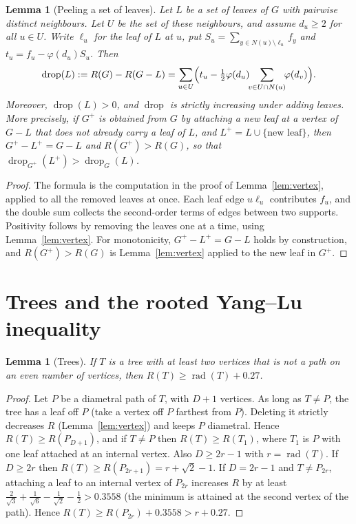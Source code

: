 \documentclass[11pt,a4paper]{article}
\newtheorem{lemma}[theorem]{Lemma}
\theoremstyle{definition}
\newcommand{\rad}{\operatorname{rad}}
\newcommand{\drop}{\operatorname{drop}}
\begin{document}
\begin{lemma}[Peeling a set of leaves]\label{lem:dropformula}
Let $L$ be a set of leaves of $G$ with pairwise distinct neighbours. Let $U$ be the set of these neighbours, and assume $d_u\ge2$ for all $u\in U$. Write $\ell_u$ for the leaf of $L$ at $u$, put $S_u=\sum_{y\in N(u)\setminus\ell_u}f_y$ and $t_u=f_u-\varphi(d_u)S_u$. Then
\[
\drop(L):=R(G)-R(G-L)=\sum_{u\in U}\Bigl(t_u-\tfrac12\varphi(d_u)\!\!\sum_{v\in U\cap N(u)}\!\!\varphi(d_v)\Bigr).
\]
Moreover, $\drop(L)>0$, and $\drop$ is strictly increasing under adding leaves. More precisely, if $G^+$ is obtained from $G$ by attaching a new leaf at a vertex of $G-L$ that does not already carry a leaf of $L$, and $L^+=L\cup\{\text{new leaf}\}$, then $G^+-L^+=G-L$ and $R(G^+)>R(G)$, so that $\drop_{G^+}(L^+)>\drop_G(L)$.
\end{lemma}
\begin{proof}
The formula is the computation in the proof of Lemma~\ref{lem:vertex}, applied to all the removed leaves at once. Each leaf edge $u\ell_u$ contributes $f_u$, and the double sum collects the second-order terms of edges between two supports. Positivity follows by removing the leaves one at a time, using Lemma~\ref{lem:vertex}. For monotonicity, $G^+-L^+=G-L$ holds by construction, and $R(G^+)>R(G)$ is Lemma~\ref{lem:vertex} applied to the new leaf in $G^+$.
\end{proof}

\section{Trees and the rooted Yang--Lu inequality}\label{sec:YL}

\begin{lemma}[Trees]\label{lem:trees}
If $T$ is a tree with at least two vertices that is not a path on an even number of vertices, then $R(T)\ge\rad(T)+0.27$.
\end{lemma}
\begin{proof}
Let $P$ be a diametral path of $T$, with $D+1$ vertices. As long as $T\ne P$, the tree has a leaf off $P$ (take a vertex off $P$ farthest from $P$). Deleting it strictly decreases $R$ (Lemma~\ref{lem:vertex}) and keeps $P$ diametral. Hence $R(T)\ge R(P_{D+1})$, and if $T\ne P$ then $R(T)\ge R(T_1)$, where $T_1$ is $P$ with one leaf attached at an internal vertex. Also $D\ge2r-1$ with $r=\rad(T)$. If $D\ge2r$ then $R(T)\ge R(P_{2r+1})=r+\sqrt2-1$. If $D=2r-1$ and $T\ne P_{2r}$, attaching a leaf to an internal vertex of $P_{2r}$ increases $R$ by at least $\frac2{\sqrt3}+\frac1{\sqrt6}-\frac1{\sqrt2}-\frac12>0.3558$ (the minimum is attained at the second vertex of the path). Hence $R(T)\ge R(P_{2r})+0.3558>r+0.27$.
\end{proof}
\end{document}
